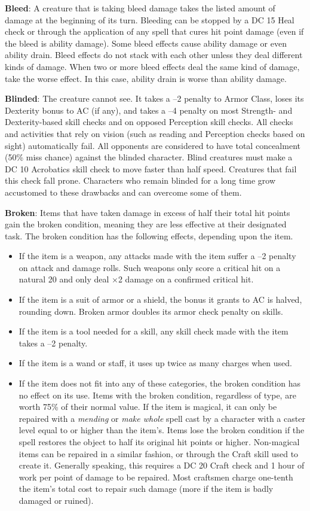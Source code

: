 \textbf{Bleed}: A creature that is taking bleed damage takes the listed amount of damage at the beginning of its turn. Bleeding can be stopped by a DC 15 Heal check or through the application of any spell that cures hit point damage (even if the bleed is ability damage). Some bleed effects cause ability damage or even ability drain. Bleed effects do not stack with each other unless they deal different kinds of damage. When two or more bleed effects deal the same kind of damage, take the worse effect. In this case, ability drain is worse than ability damage.
				
\textbf{Blinded}: The creature cannot see. It takes a --2 penalty to Armor Class, loses its Dexterity bonus to AC (if any), and takes a --4 penalty on most Strength- and Dexterity-based skill checks and on opposed Perception skill checks. All checks and activities that rely on vision (such as reading and Perception checks based on sight) automatically fail. All opponents are considered to have total concealment (50\% miss chance) against the blinded character. Blind creatures must make a DC 10 Acrobatics skill check to move faster than half speed. Creatures that fail this check fall prone. Characters who remain blinded for a long time grow accustomed to these drawbacks and can overcome some of them.
				
\textbf{Broken}: Items that have taken damage in excess of half their total hit points gain the broken condition, meaning they are less effective at their designated task. The broken condition has the following effects, depending upon the item.
				\begin{itemize}\item  If the item is a weapon, any attacks made with the item suffer a --2 penalty on attack and damage rolls. Such weapons only score a critical hit on a natural 20 and only deal \mbox{$\times$}2 damage on a confirmed critical hit.
				\item  If the item is a suit of armor or a shield, the bonus it grants to AC is halved, rounding down. Broken armor doubles its armor check penalty on skills.
				\item  If the item is a tool needed for a skill, any skill check made with the item takes a --2 penalty.
				\item  If the item is a wand or staff, it uses up twice as many charges when used.
				\item  If the item does not fit into any of these categories, the broken condition has no effect on its use. Items with the broken condition, regardless of type, are worth 75\% of their normal value. If the item is magical, it can only be repaired with a \textit{mending} or \textit{make whole }spell cast by a character with a caster level equal to or higher than the item's. Items lose the broken condition if the spell restores the object to half its original hit points or higher\textit{. }Non-magical items can be repaired in a similar fashion, or through the Craft skill used to create it. Generally speaking, this requires a DC 20 Craft check and 1 hour of work per point of damage to be repaired. Most craftsmen charge one-tenth the item's total cost to repair such damage (more if the item is badly damaged or ruined).
\end{itemize}
				

